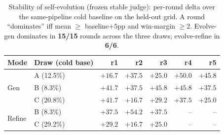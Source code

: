 \begin{table}[t]
\centering
\caption{Stability of self-evolution (frozen stable judge): per-round
delta over the same-pipeline cold baseline on the held-out grid. A round
``dominates'' iff mean $\geq$ baseline$+5$pp and win-margin $\geq 2$.
Evolve-gen dominates in \textbf{15/15} rounds across the three draws;
evolve-refine in \textbf{6/6}.}
\label{tab:stability}
\small
\begin{tabular}{llrrrrr}
\toprule
Mode & Draw (cold base) & r1 & r2 & r3 & r4 & r5\\
\midrule
\multirow{3}{*}{Gen}
 & A (12.5\%) & $+16.7$ & $+37.5$ & $+25.0$ & $+50.0$ & $+45.8$\\
 & B (8.3\%)  & $+41.7$ & $+37.5$ & $+45.8$ & $+45.8$ & $+37.5$\\
 & C (20.8\%) & $+41.7$ & $+16.7$ & $+29.2$ & $+37.5$ & $+25.0$\\
\midrule
\multirow{2}{*}{Refine}
 & B (8.3\%)  & $+37.5$ & $+54.2$ & $+37.5$ & -- & --\\
 & C (29.2\%) & $+29.2$ & $+16.7$ & $+25.0$ & -- & --\\
\bottomrule
\end{tabular}
\end{table}

